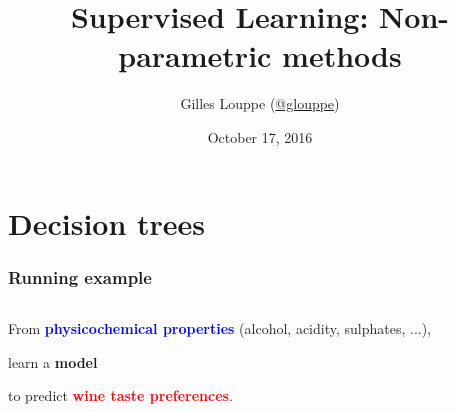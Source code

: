 \documentclass{beamer}
\title{{\bf Supervised Learning: Non-parametric methods}}
\author{
Gilles Louppe (\href{https://twitter.com/glouppe}{@glouppe})
}
\date{October 17, 2016}
\newcommand{\X}[1]{\textcolor{blue}{#1}}
\newcommand{\y}[1]{\textcolor{red}{#1}}
\newcommand{\model}[1]{\textcolor{mygreen}{#1}}
\begin{document}
\begin{frame}[plain]
\titlepage
\end{frame}





\section{Decision trees}

\begin{frame}
    \frametitle{Running example}

    \begin{columns}
    \begin{column}{0.5\textwidth}

    \begin{center}
    From {\bf \X{physicochemical properties}} (alcohol, acidity, sulphates, ...),

    \vspace{1cm}
    learn a {\bf \model{model}}
    \vspace{1cm}

    to predict {\bf \y{wine taste preferences}}.

    \end{center}


\end{column}
\end{columns}
\end{frame}
\end{document}

